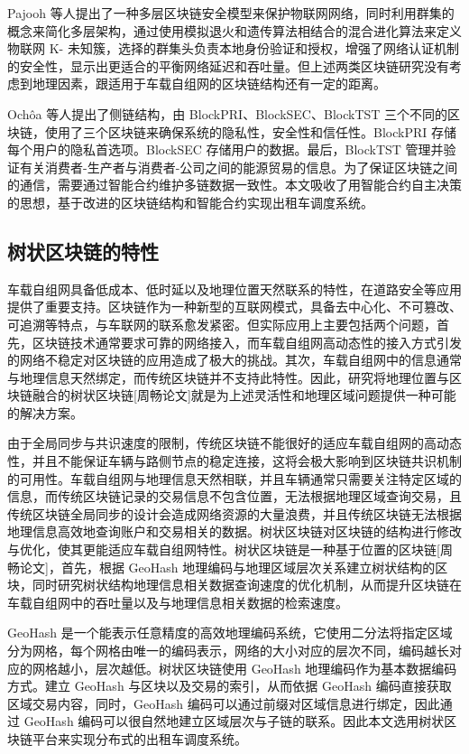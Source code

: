 Pajooh 等人提出了一种多层区块链安全模型来保护物联网网络，同时利用群集的概念来简化多层架构，通过使用模拟退火和遗传算法相结合的混合进化算法来定义物联网 K- 未知簇，选择的群集头负责本地身份验证和授权，增强了网络认证机制的安全性，显示出更适合的平衡网络延迟和吞吐量。但上述两类区块链研究没有考虑到地理因素，跟适用于车载自组网的区块链结构还有一定的距离。\par

Ochôa 等人提出了侧链结构，由 BlockPRI、BlockSEC、BlockTST 三个不同的区块链，使用了三个区块链来确保系统的隐私性，安全性和信任性。BlockPRI 存储每个用户的隐私首选项。BlockSEC 存储用户的数据。最后，BlockTST 管理并验证有关消费者-生产者与消费者-公司之间的能源贸易的信息。为了保证区块链之间的通信，需要通过智能合约维护多链数据一致性。本文吸收了用智能合约自主决策的思想，基于改进的区块链结构和智能合约实现出租车调度系统。\par

\subsection{树状区块链的特性}
车载自组网具备低成本、低时延以及地理位置天然联系的特性，在道路安全等应用提供了重要支持。区块链作为一种新型的互联网模式，具备去中心化、不可篡改、可追溯等特点，与车联网的联系愈发紧密。但实际应用上主要包括两个问题，首先，区块链技术通常要求可靠的网络接入，而车载自组网高动态性的接入方式引发的网络不稳定对区块链的应用造成了极大的挑战。其次，车载自组网中的信息通常与地理信息天然绑定，而传统区块链并不支持此特性。因此，研究将地理位置与区块链融合的树状区块链[周畅论文]就是为上述灵活性和地理区域问题提供一种可能的解决方案。\par

由于全局同步与共识速度的限制，传统区块链不能很好的适应车载自组网的高动态性，并且不能保证车辆与路侧节点的稳定连接，这将会极大影响到区块链共识机制的可用性。车载自组网与地理信息天然相联，并且车辆通常只需要关注特定区域的信息，而传统区块链记录的交易信息不包含位置，无法根据地理区域查询交易，且传统区块链全局同步的设计会造成网络资源的大量浪费，并且传统区块链无法根据地理信息高效地查询账户和交易相关的数据。树状区块链对区块链的结构进行修改与优化，使其更能适应车载自组网特性。树状区块链是一种基于位置的区块链[周畅论文]，首先，根据 GeoHash 地理编码与地理区域层次关系建立树状结构的区块，同时研究树状结构地理信息相关数据查询速度的优化机制，从而提升区块链在车载自组网中的吞吐量以及与地理信息相关数据的检索速度。\par
GeoHash 是一个能表示任意精度的高效地理编码系统，它使用二分法将指定区域分为网格，每个网格由唯一的编码表示，网络的大小对应的层次不同，编码越长对应的网格越小，层次越低。树状区块链使用 GeoHash 地理编码作为基本数据编码方式。建立 GeoHash 与区块以及交易的索引，从而依据 GeoHash 编码直接获取区域交易内容，同时，GeoHash 编码可以通过前缀对区域信息进行绑定，因此通过 GeoHash
编码可以很自然地建立区域层次与子链的联系。因此本文选用树状区块链平台来实现分布式的出租车调度系统。

